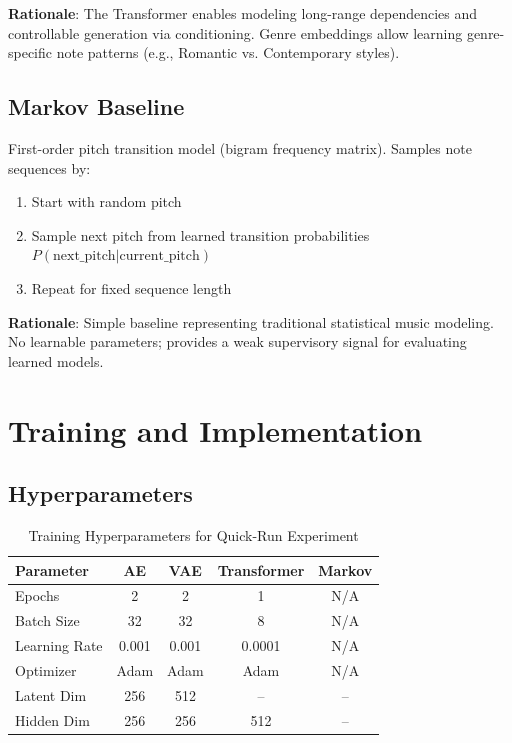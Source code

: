 \documentclass[conference]{IEEEtran}
\begin{document}
\textbf{Rationale}: The Transformer enables modeling long-range dependencies and controllable generation via conditioning. Genre embeddings allow learning genre-specific note patterns (e.g., Romantic vs. Contemporary styles).

\subsection{Markov Baseline}
First-order pitch transition model (bigram frequency matrix). Samples note sequences by:
\begin{enumerate}
    \item Start with random pitch
    \item Sample next pitch from learned transition probabilities $P(\text{next\_pitch} | \text{current\_pitch})$
    \item Repeat for fixed sequence length
\end{enumerate}

\textbf{Rationale}: Simple baseline representing traditional statistical music modeling. No learnable parameters; provides a weak supervisory signal for evaluating learned models.

\section{Training and Implementation}

\subsection{Hyperparameters}
\begin{table}[h]
\centering
\caption{Training Hyperparameters for Quick-Run Experiment}
\label{tab:hyperparams}
\begin{tabular}{lcccc}
\toprule
\textbf{Parameter} & \textbf{AE} & \textbf{VAE} & \textbf{Transformer} & \textbf{Markov} \\
\midrule
Epochs & 2 & 2 & 1 & N/A \\
Batch Size & 32 & 32 & 8 & N/A \\
Learning Rate & 0.001 & 0.001 & 0.0001 & N/A \\
Optimizer & Adam & Adam & Adam & N/A \\
Latent Dim & 256 & 512 & -- & -- \\
Hidden Dim & 256 & 256 & 512 & -- \\
\bottomrule
\end{tabular}
\end{table}
\end{document}
